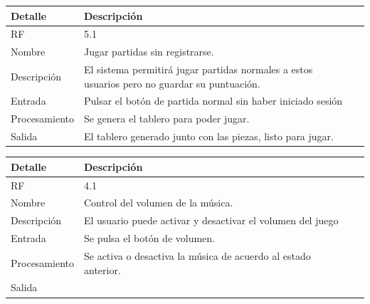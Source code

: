 \documentclass{article}
\begin{document}
\begin{table}[H]
  \begin{center}
    \begin{tabularx}{\linewidth}{|X|X|X|} %
      \hline
      \textbf{Detalle} & \textbf{Descripción}\\
      \hline
      RF & 5.1 \\
      \hline
      Nombre & Jugar partidas sin registrarse.\\
      \hline
      Descripción & El sistema permitirá jugar partidas normales a estos usuarios pero no guardar su puntuación.\\
      \hline
      Entrada & Pulsar el botón de partida normal sin haber iniciado sesión\\
      \hline
      Procesamiento & Se genera el tablero para poder jugar.\\
      \hline
      Salida & El tablero generado junto con las piezas, listo para jugar.\\
      \hline
    \end{tabularx}
  \end{center}
\end{table}

\begin{table}[H]
  \begin{center}
    \begin{tabularx}{\linewidth}{|X|X|X|} %
      \hline
      \textbf{Detalle} & \textbf{Descripción}\\
      \hline
      RF & 4.1 \\
      \hline
      Nombre & Control del volumen de la música.\\
      \hline
      Descripción & El usuario puede activar y desactivar el volumen del juego\\
      \hline
      Entrada & Se pulsa el botón de volumen.\\
      \hline
      Procesamiento & Se activa o desactiva la música de acuerdo al estado anterior. \\
      \hline
      Salida & \\
      \hline
    \end{tabularx}
  \end{center}
\end{table}
\end{document}
